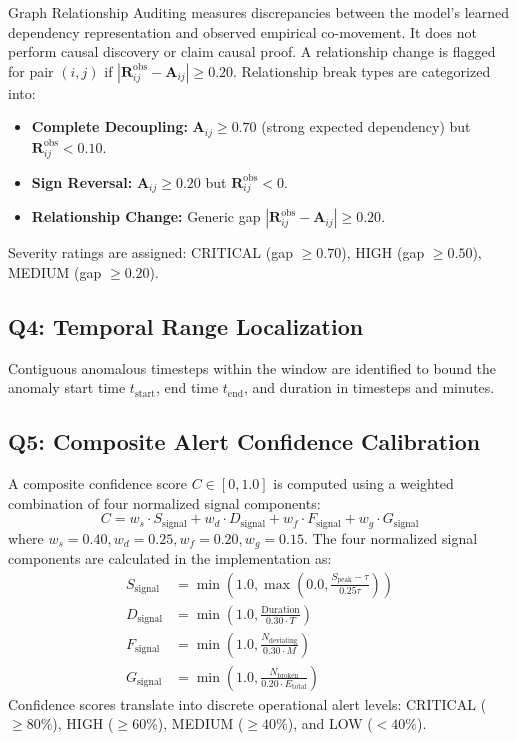 \documentclass[conference]{IEEEtran}
\begin{document}
Graph Relationship Auditing measures discrepancies between the model's learned dependency representation and observed empirical co-movement. It does not perform causal discovery or claim causal proof. A relationship change is flagged for pair $(i, j)$ if $|\mathbf{R}^{\text{obs}}_{ij} - \mathbf{A}_{ij}| \ge 0.20$. Relationship break types are categorized into:
\begin{itemize}
    \item \textbf{Complete Decoupling:} $\mathbf{A}_{ij} \ge 0.70$ (strong expected dependency) but $\mathbf{R}^{\text{obs}}_{ij} < 0.10$.
    \item \textbf{Sign Reversal:} $\mathbf{A}_{ij} \ge 0.20$ but $\mathbf{R}^{\text{obs}}_{ij} < 0$.
    \item \textbf{Relationship Change:} Generic gap $|\mathbf{R}^{\text{obs}}_{ij} - \mathbf{A}_{ij}| \ge 0.20$.
\end{itemize}
Severity ratings are assigned: CRITICAL (gap $\ge 0.70$), HIGH (gap $\ge 0.50$), MEDIUM (gap $\ge 0.20$).

\subsection{Q4: Temporal Range Localization}
Contiguous anomalous timesteps within the window are identified to bound the anomaly start time $t_{\text{start}}$, end time $t_{\text{end}}$, and duration in timesteps and minutes.

\subsection{Q5: Composite Alert Confidence Calibration}
A composite confidence score $C \in [0, 1.0]$ is computed using a weighted combination of four normalized signal components:
\begin{equation}
    C = w_s \cdot S_{\text{signal}} + w_d \cdot D_{\text{signal}} + w_f \cdot F_{\text{signal}} + w_g \cdot G_{\text{signal}}
\end{equation}
where $w_s = 0.40, w_d = 0.25, w_f = 0.20, w_g = 0.15$. The four normalized signal components are calculated in the implementation as:
\begin{align}
    S_{\text{signal}} &= \min\left(1.0, \max\left(0.0, \frac{S_{\text{peak}} - \tau}{0.25 \tau}\right)\right) \\
    D_{\text{signal}} &= \min\left(1.0, \frac{\text{Duration}}{0.30 \cdot T}\right) \\
    F_{\text{signal}} &= \min\left(1.0, \frac{N_{\text{deviating}}}{0.30 \cdot M}\right) \\
    G_{\text{signal}} &= \min\left(1.0, \frac{N_{\text{broken}}}{0.20 \cdot E_{\text{total}}}\right)
\end{align}
Confidence scores translate into discrete operational alert levels: CRITICAL ($\ge 80\%$), HIGH ($\ge 60\%$), MEDIUM ($\ge 40\%$), and LOW ($< 40\%$).
\end{document}
